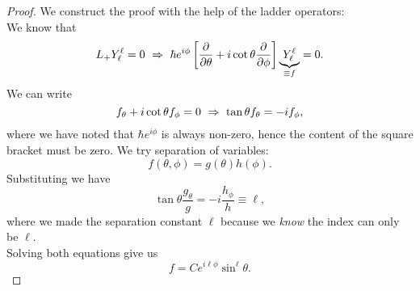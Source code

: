 \begin{proof}
We construct the proof with the help of the ladder operators: \\
We know that
\begin{equation}
L_+Y^{\ell}_{\ell}=0\ \imp\ \hbar e^{i\phi}\lf[\diffp{}{\theta}+i\cot\theta\diffp{}{\phi} \rt]\underbrace{Y^{\ell}_{\ell}}_{\equiv f}=0. 
\end{equation}
We can write
\begin{equation}
f_{\theta}+i\cot\theta f_{\phi}=0\ \imp\ \tan\theta f_{\theta}=-if_{\phi}, 
\end{equation}
where we have noted that $\hbar e^{i\phi}$ is always non-zero, hence the content 
of the square bracket must be zero. We try separation of variables:
\begin{equation}
f(\theta,\phi)=g(\theta)h(\phi).
\end{equation}
Substituting we have
\begin{equation}
\tan\theta\frac{g_{\theta}}{g}=-i\frac{h_{\phi}}{h}\equiv \ell, 
\end{equation}
where we made the separation constant $\ell$ because we \textit{know} the index 
can only be $\ell$. \\
Solving both equations give us
\begin{equation}
f=Ce^{i\ell\phi}\sin^{\ell}\theta. 
\end{equation}
\end{proof}
